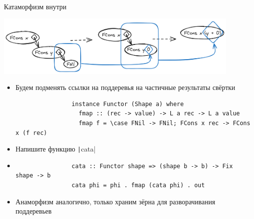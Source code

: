     \begin{frame}[fragile]{Катаморфизм внутри}
        \begin{center}
            \includegraphics[width=0.9\textwidth]{figs/cataStep.excalidraw}
        \end{center}
        \begin{itemize}
            \item Будем подменять ссылки на поддеревья на частичные результаты свёртки
            \begin{verbatim}
                instance Functor (Shape a) where
                  fmap :: (rec -> value) -> L a rec -> L a value
                  fmap f = \case FNil -> FNil; FCons x rec -> FCons x (f rec)
            \end{verbatim}
            \item[\todo] Напишите функцию \texttt|cata|
            \item[\answer] \pause
            \begin{verbatim}
                cata :: Functor shape => (shape b -> b) -> Fix shape -> b
                cata phi = phi . fmap (cata phi) . out
            \end{verbatim}
            \item Анаморфизм аналогично, только храним зёрна для разворачивания поддеревьев
        \end{itemize}
    \end{frame}

